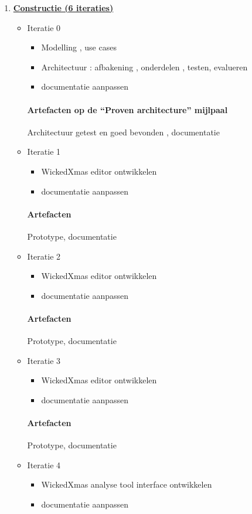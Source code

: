 \begin{enumerate}
\item \underline{\textbf{Constructie (6 iteraties)}}
	\begin{itemize}
	\item Iteratie 0
		\begin{itemize}
		\item Modelling , use cases
		\item Architectuur : afbakening , onderdelen , testen, evalueren
		\item documentatie aanpassen
		\end{itemize}
		\paragraph{Artefacten op de ``Proven architecture'' mijlpaal}
		 Architectuur getest en goed bevonden , documentatie
	\item Iteratie 1
		\begin{itemize}
		\item WickedXmas editor ontwikkelen
		\item documentatie aanpassen
		\end{itemize}
		\paragraph{Artefacten}
		Prototype, documentatie
	\item Iteratie 2
		\begin{itemize}
		\item WickedXmas editor ontwikkelen
		\item documentatie aanpassen
		\end{itemize}
		\paragraph{Artefacten}
		Prototype, documentatie
	\item Iteratie 3
		\begin{itemize}
		\item WickedXmas editor ontwikkelen
		\item documentatie aanpassen
		\end{itemize}
		\paragraph{Artefacten}
		Prototype, documentatie
	\item Iteratie 4
		\begin{itemize}
		\item WickedXmas analyse tool interface ontwikkelen
		\item documentatie aanpassen
		\end{itemize}

\end{itemize}
\end{enumerate}
